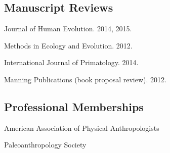 \documentclass{article}
\begin{document}
\subsection*{Manuscript Reviews}
\begin{description*}
\item[] Journal of Human Evolution. 2014, 2015.
\item[] Methods in Ecology and Evolution. 2012.
\item[] International Journal of Primatology. 2014.
\item[] Manning Publications (book proposal review). 2012.
\end{description*}
\subsection*{Professional Memberships}
\begin{description*}
\item[] American Association of Physical Anthropologists
\item[] Paleoanthropology Society
\end{description*}
\end{document}
